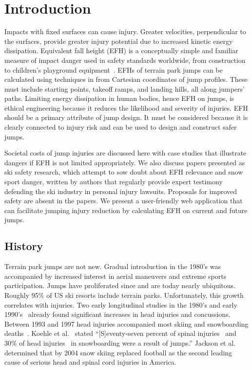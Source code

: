 \documentclass[smallextended]{svjour3}       %
\begin{document}
\section{Introduction}
\label{intro}
%
Impacts with fixed surfaces can cause injury. Greater velocities, perpendicular
to the surfaces, provide greater injury potential due to increased kinetic
energy dissipation. Equivalent fall height (EFH) is a conceptually simple and
familiar measure of impact danger used in safety standards worldwide, from
construction~\cite{OSHA2021} to children's playground
equipment~\cite{Chalmers1996}. EFHs of terrain park jumps can be calculated
using techniques in \cite{Levy2015} from Cartesian coordinates of jump
profiles. These must include starting points, takeoff ramps, and landing hills, all
along jumpers' paths. Limiting energy dissipation in human bodies, hence EFH on
jumps, is ethical engineering because it reduces the likelihood and severity of
injuries. EFH should be a primary attribute of jump design. It must be
considered because it is clearly connected to injury risk and can be used to
design and construct safer jumps.

Societal costs of jump injuries are discussed here with case studies that
illustrate dangers if EFH is not limited appropriately. We also discuss papers
presented as ski safety research, which attempt to sow doubt about EFH
relevance and snow sport danger, written by authors that regularly provide
expert testimony defending the ski industry in personal injury lawsuits.
Proposals for improved safety are absent in the papers. We present a
user-friendly web application that can facilitate jumping injury reduction by
calculating EFH on current and future jumps.

\subsection{History}
\label{sec:hist}
%
Terrain park jumps are not new. Gradual introduction in the 1980's was
accompanied by increased interest in aerial maneuvers and extreme sports
participation. Jumps have proliferated since and are today nearly ubiquitous.
Roughly 95\% of US ski resorts include terrain parks. Unfortunately, this
growth correlates with injuries. Two early longitudinal studies in the 1980's
and early 1990's~\cite{Deibert1998,Furrer1995} already found significant
increases in head injuries and concussions. Between 1993 and 1997 head injuries
accompanied most skiing and snowboarding deaths~\cite{CPSC1999}. Koehle et
al.~\cite{Koehle2002} stated ``[S]eventy-seven percent of spinal
injuries~\cite{Tarazi1999} and 30\% of head injuries~\cite{Fukuda2001} in
snowboarding were a result of jumps.'' Jackson et al.~\cite{Jackson2004}
determined that by 2004 snow skiing replaced football as the second leading
cause of serious head and spinal cord injuries in America.
\end{document}
